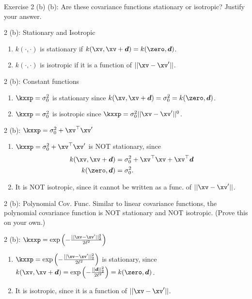 \documentclass[aspectratio=169]{beamer}
\newcommand{\xvp}{\xv^\prime}
\newcommand{\dv}{\bm{d}}
\begin{document}
\begin{frame}{Exercise 2 (b)}
	(b): Are these covariance functions stationary or isotropic? Justify your answer.
\end{frame}

\begin{frame}{2 (b): Stationary and Isotropic}
	\begin{enumerate}
		\item $k(\cdot, \cdot)$ is stationary if $k(\xv, \xv + \dv) = k(\zero, \dv)$.
		\item $k(\cdot, \cdot)$ is isotropic if it is a function of $||\xv - \xvp||$.
	\end{enumerate}
\end{frame}

\begin{frame}{2 (b): Constant functions}
	\begin{enumerate}
		\item<1-> $\kxxp = \sigma_0^2$ is stationary since $k(\xv, \xv + \dv) = \sigma_0^2  = k(\zero, \dv)$.
		\item<2-> $\kxxp = \sigma_0^2$ is isotropic since $ \kxxp = \sigma_0^2||\xv - \xvp ||^0$.
	\end{enumerate}
\end{frame}

\begin{frame}{2 (b): $\kxxp = \sigma_0^2 + \xv^\top \xvp$}
	\begin{enumerate}
		\item<1-> $\kxxp = \sigma_0^2 + \xv^\top \xvp$ is NOT stationary, since
		\begin{align*}
			k(\xv, \xv + \dv) &= \sigma_0^2 + \xv^\top \xv + \xv^\top \dv \\
			k(\zero, \dv) &= \sigma_0^2.
		\end{align*}
		\item<2-> It is NOT isotropic, since it cannot be written as a func. of $|| \xv - \xvp||$.
	\end{enumerate}
\end{frame}

\begin{frame}{2 (b): Polynomial Cov. Func.}
	Similar to linear covariance functions, the polynomial covariance function is NOT stationary and NOT isotropic. (Prove this on your own.)
\end{frame}

\begin{frame}{2 (b): $\kxxp = \exp\left( - \frac{||\xv - \xvp||_2^2}{2 \ell^2}\right)$}
	\begin{enumerate}
		\item<1-> $\kxxp = \exp\left( - \frac{||\xv - \xvp||_2^2}{2 \ell^2}\right)$ is stationary, since $k(\xv, \xv + \dv) = \exp \left( - \frac{||\dv||_2^2}{2 \ell^2} \right) = k(\zero, \dv)$.
		\item<2-> It is isotropic, since it is a function of $||\xv - \xvp||$.
	\end{enumerate}
\end{frame}
\end{document}
